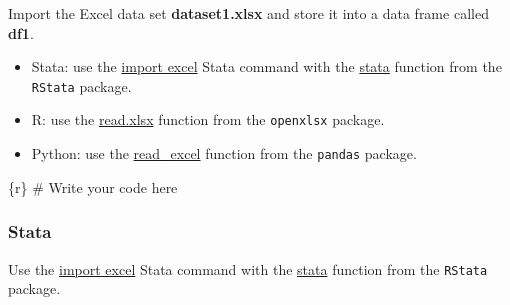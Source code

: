 \documentclass[
  letterpaper,
  DIV=11,
  numbers=noendperiod,
  oneside]{scrreprt}
\newenvironment{Shaded}{\begin{snugshade}}{\end{snugshade}}
\newcommand{\CommentTok}[1]{\textcolor[rgb]{0.37,0.37,0.37}{#1}}
\newcommand{\InformationTok}[1]{\textcolor[rgb]{0.37,0.37,0.37}{#1}}
\providecommand{\tightlist}{%
  \setlength{\itemsep}{0pt}\setlength{\parskip}{0pt}}\usepackage{longtable,booktabs,array}
\begin{document}
Import the Excel data set \textbf{dataset1.xlsx} and store it into a
data frame called \textbf{df1}.

\begin{tcolorbox}[enhanced jigsaw, coltitle=black, opacityback=0, title=\textcolor{quarto-callout-tip-color}{\faLightbulb}\hspace{0.5em}{Tip}, toprule=.15mm, bottomtitle=1mm, colbacktitle=quarto-callout-tip-color!10!white, colframe=quarto-callout-tip-color-frame, left=2mm, opacitybacktitle=0.6, bottomrule=.15mm, arc=.35mm, toptitle=1mm, colback=white, titlerule=0mm, breakable, leftrule=.75mm, rightrule=.15mm]

\begin{itemize}
\tightlist
\item
  Stata: use the
  \href{https://www.stata.com/manuals/dimportexcel.pdf}{import excel}
  Stata command with the
  \href{https://rdrr.io/github/lbraglia/RStata/man/stata.html}{stata}
  function from the \texttt{RStata} package.
\item
  R: use the
  \href{https://www.rdocumentation.org/packages/openxlsx/versions/4.2.5/topics/read.xlsx}{read.xlsx}
  function from the \texttt{openxlsx} package.
\item
  Python: use the
  \href{https://pandas.pydata.org/docs/reference/api/pandas.read_excel.html}{read\_excel}
  function from the \texttt{pandas} package.
\end{itemize}

\end{tcolorbox}

\begin{Shaded}
\begin{Highlighting}[]
\InformationTok{\textasciigrave{}\textasciigrave{}\textasciigrave{}\{r\}}
\CommentTok{\# Write your code here}
\InformationTok{\textasciigrave{}\textasciigrave{}\textasciigrave{}}
\end{Highlighting}
\end{Shaded}

\subsubsection{Stata}

Use the \href{https://www.stata.com/manuals/dimportexcel.pdf}{import
excel} Stata command with the
\href{https://rdrr.io/github/lbraglia/RStata/man/stata.html}{stata}
function from the \texttt{RStata} package.
\end{document}
